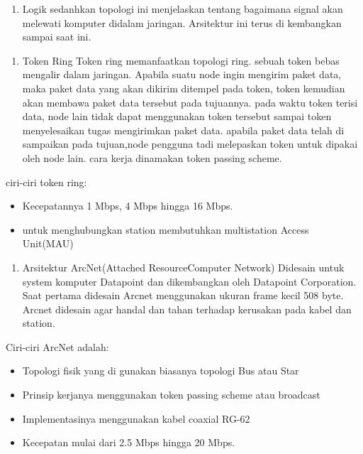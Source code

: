 \begin{enumerate}
  \item Logik
        sedanhkan topologi ini menjelaskan tentang bagaimana signal akan melewati komputer didalam jaringan. Arsitektur ini terus di kembangkan sampai saat ini.
\end{enumerate}

\begin{enumerate}
  \item  Token Ring
         Token ring memanfaatkan topologi ring. sebuah token bebas mengalir dalam jaringan. Apabila suatu node ingin mengirim paket data, maka paket data yang akan dikirim ditempel pada token, token kemudian akan membawa paket data tersebut pada tujuannya. pada waktu token terisi data, node lain tidak dapat menggunakan token tersebut sampai token menyelesaikan tugas mengirimkan paket data. apabila paket data telah di sampaikan pada tujuan,node pengguna tadi melepaskan token untuk dipakai oleh node lain. cara kerja dinamakan token passing scheme.
\end{enumerate}
ciri-ciri token ring:
\begin{itemize}
  \item Kecepatannya 1 Mbps, 4 Mbps hingga 16 Mbps.
  \item untuk menghubungkan station membutuhkan multistation Access Unit(MAU)
\end{itemize}

\begin{enumerate}
  \item Arsitektur ArcNet(Attached ResourceComputer Network)
        Didesain untuk system komputer Datapoint dan dikembangkan oleh Datapoint Corporation. Saat pertama didesain Arcnet menggunakan ukuran frame kecil 508 byte. Arcnet didesain agar handal dan tahan terhadap kerusakan pada kabel dan station.
\end{enumerate}
Ciri-ciri ArcNet adalah:
\begin{itemize}
  \item Topologi fisik yang di gunakan biasanya topologi Bus atau Star
  \item Prinsip kerjanya menggunakan token passing scheme atau broadcast
  \item Implementasinya menggunakan kabel coaxial RG-62
  \item Kecepatan mulai dari 2.5 Mbps hingga 20 Mbps.
\end{itemize}
